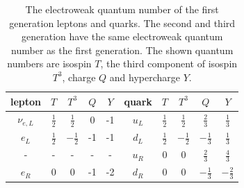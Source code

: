 \begin{table}[ht]
    \centering
    \setlength{\tabcolsep}{1 em}
    \renewcommand{\arraystretch}{1.5}
    \caption{The electroweak quantum number of the first generation leptons and quarks. The second and third generation have the same electroweak quantum number as the first generation. The shown quantum numbers are isospin $T$, the third component of isospin $T^3$, charge $Q$ and hypercharge $Y$. }
    \begin{tabular}{ccccc|ccccc}
    \hline
    lepton      & $T$           & $T^3$          & $Q$ & $Y$ & quark  & $T$           & $T^3$          & $Q$            & $Y$            \\
    \hline
    $\nu_{e,L}$ & $\frac{1}{2}$ & $\frac{1}{2}$  & 0   & -1  & $u_L$  & $\frac{1}{2}$ & $\frac{1}{2}$  & $\frac{2}{3}$  & $\frac{1}{3}$  \\
    $e_L$       & $\frac{1}{2}$ & $-\frac{1}{2}$ & -1  & -1  & $d_L$  & $\frac{1}{2}$ & $-\frac{1}{2}$ & $-\frac{1}{3}$ & $\frac{1}{3}$  \\
    \hline
    -           & -             & -              & -   & -   & $u_R$  & 0             & 0              & $\frac{2}{3}$  & $\frac{4}{3}$  \\
    $e_R$       & 0             & 0              & -1  & -2  & $d_R$  & 0             & 0              & $-\frac{1}{3}$ & $-\frac{2}{3}$ \\
    \hline
    \end{tabular}
    \label{tab:physics:smParticles:ewQuantumNumber}
\end{table}



